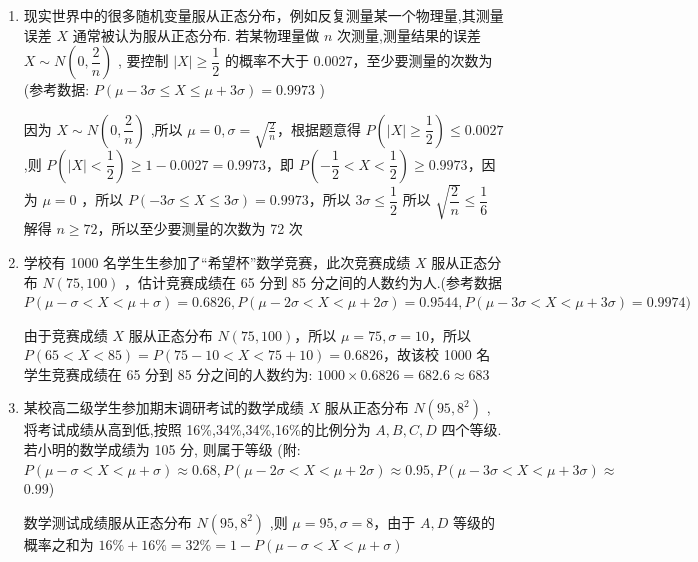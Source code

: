 \begin{enumerate}
\begin{enumerate}
        \item 现实世界中的很多随机变量服从正态分布，例如反复测量某一个物理量,其测量误差 $X$ 通常被认为服从正态分布. 若某物理量做 $n$ 次测量,测量结果的误差 $X \sim  N\left( {0,\dfrac{2}{n}}\right)$ , 要控制 $\left| X\right|  \geq  \dfrac{1}{2}$ 的概率不大于 0.0027，至少要测量的次数为(参考数据: $P\left( {\mu  - {3\sigma } \leq  X \leq  \mu  + {3\sigma }}\right)  = {0.9973}$ )
        \begin{jieda}
            因为 $X \sim  N\left( {0,\dfrac{2}{n}}\right)$ ,所以 $\mu  = 0,\sigma  = \sqrt{\frac{2}{n}}$，根据题意得 $P\left( {\left| X\right|  \geq  \dfrac{1}{2}}\right)  \leq  {0.0027}$ ,则 $P\left( {\left| X\right|  < \dfrac{1}{2}}\right)  \geq  1 - {0.0027} = {0.9973}$，即 $P\left( {-\dfrac{1}{2} < X < \dfrac{1}{2}}\right)  \geq  {0.9973}$，因为 $\mu  = 0$ ，所以 $P\left( {-{3\sigma } \leq  X \leq  {3\sigma }}\right)  = {0.9973}$，所以 ${3\sigma } \leq  \dfrac{1}{2}$ 所以 $\sqrt{\dfrac{2}{n}} \leq  \dfrac{1}{6}$ 解得 $n \geq  {72}$，所以至少要测量的次数为 72 次
        \end{jieda}
        \item 学校有 1000 名学生生参加了“希望杯”数学竞赛，此次竞赛成绩 $X$ 服从正态分布 $N\left( {{75},{100}}\right)$ ，估计竞赛成绩在 65 分到 85 分之间的人数约为人.(参考数据 $P\left( {\mu  - \sigma  < X < \mu  + \sigma }\right)  = {0.6826},P\left( {\mu  - {2\sigma } < X < \mu  + {2\sigma }}\right)  = {0.9544},P(\mu  - {3\sigma } < X <  \mu  + {3\sigma }) = {0.9974})$
        \begin{jieda}
            由于竞赛成绩 $X$ 服从正态分布 $N\left( {{75},{100}}\right)$，所以 $\mu  = {75},\sigma  = {10}$，所以 $P\left( {{65} < X < {85}}\right)  = P\left( {{75} - {10} < X < {75} + {10}}\right)  = {0.6826}$，故该校 1000 名学生竞赛成绩在 65 分到 85 分之间的人数约为: $1000 \times 0.6826=682.6 \approx 683$
        \end{jieda}
        \item 某校高二级学生参加期末调研考试的数学成绩 $X$ 服从正态分布 $N\left( {{95},{8}^{2}}\right)$ ,将考试成绩从高到低,按照 16\%,34\%,34\%,16\%的比例分为 $A,B,C,D$ 四个等级. 若小明的数学成绩为 105 分, 则属于等级 (附: $P\left( {\mu  - \sigma  < X < \mu  + \sigma }\right)  \approx  {0.68},P\left( {\mu  - {2\sigma } < X < \mu  + {2\sigma }}\right)  \approx  {0.95},P\left( {\mu  - {3\sigma } < X < \mu  + {3\sigma }}\right)  \approx$ 0.99)
        \begin{jieda}
            数学测试成绩服从正态分布 $N\left( {{95},{8}^{2}}\right)$ ,则 $\mu  = {95},\sigma  = 8$，由于 $A,D$ 等级的概率之和为 ${16}\%  + {16}\%  = {32}\%  = 1 - P\left( {\mu  - \sigma  < X < \mu  + \sigma }\right)$
            

\end{jieda}
\end{enumerate}
\end{enumerate}

